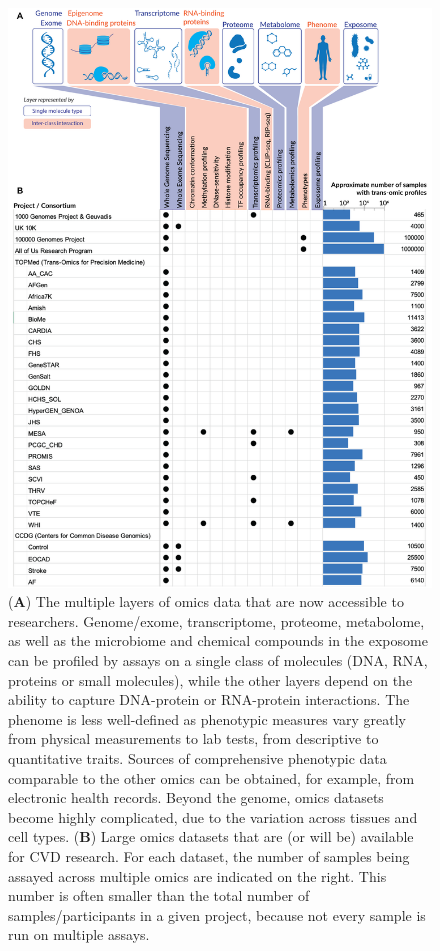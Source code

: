 \documentclass[letter]{bioinfo}
\begin{document}
    	\begin{figure}[!tpb]
	\includegraphics[width=0.9\linewidth]{trans-omics-data-sets.png}
		\caption{ (\textbf{A}) The multiple layers of omics data that are now accessible to researchers. Genome/exome, transcriptome, proteome, metabolome, as well as the microbiome and chemical compounds in the exposome can be profiled by assays on a single class of molecules (DNA, RNA, proteins or small molecules), while the other layers depend on the ability to capture DNA-protein or RNA-protein interactions. The phenome is less well-defined as phenotypic measures vary greatly from physical measurements to lab tests, from descriptive to quantitative traits. Sources of comprehensive phenotypic data comparable to the other omics can be obtained, for example, from electronic health records.
		Beyond the genome, omics datasets become highly complicated, due to the variation across tissues and cell types.
		(\textbf{B}) Large omics datasets that are (or will be) available for CVD research. For each dataset, the number of samples being assayed across multiple omics are indicated on the right. This number is often smaller than the total number of samples/participants in a given project, because not every sample is run on multiple assays.}
		\label{fig:trans-omics}
	\end{figure} 
	
\end{document}
